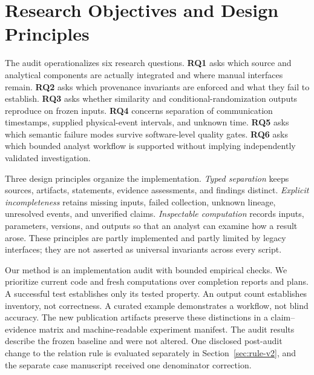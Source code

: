 \section{Research Objectives and Design Principles}
The audit operationalizes six research questions. \textbf{RQ1} asks which source and analytical components are actually integrated and where manual interfaces remain. \textbf{RQ2} asks which provenance invariants are enforced and what they fail to establish. \textbf{RQ3} asks whether similarity and conditional-randomization outputs reproduce on frozen inputs. \textbf{RQ4} concerns separation of communication timestamps, supplied physical-event intervals, and unknown time. \textbf{RQ5} asks which semantic failure modes survive software-level quality gates. \textbf{RQ6} asks which bounded analyst workflow is supported without implying independently validated investigation.

Three design principles organize the implementation. \emph{Typed separation} keeps sources, artifacts, statements, evidence assessments, and findings distinct. \emph{Explicit incompleteness} retains missing inputs, failed collection, unknown lineage, unresolved events, and unverified claims. \emph{Inspectable computation} records inputs, parameters, versions, and outputs so that an analyst can examine how a result arose. These principles are partly implemented and partly limited by legacy interfaces; they are not asserted as universal invariants across every script.

Our method is an implementation audit with bounded empirical checks. We prioritize current code and fresh computations over completion reports and plans. A successful test establishes only its tested property. An output count establishes inventory, not correctness. A curated example demonstrates a workflow, not blind accuracy. The new publication artifacts preserve these distinctions in a claim--evidence matrix and machine-readable experiment manifest. The audit results describe the frozen baseline and were not altered. One disclosed post-audit change to the relation rule is evaluated separately in Section~\ref{sec:rule-v2}, and the separate case manuscript received one denominator correction.
